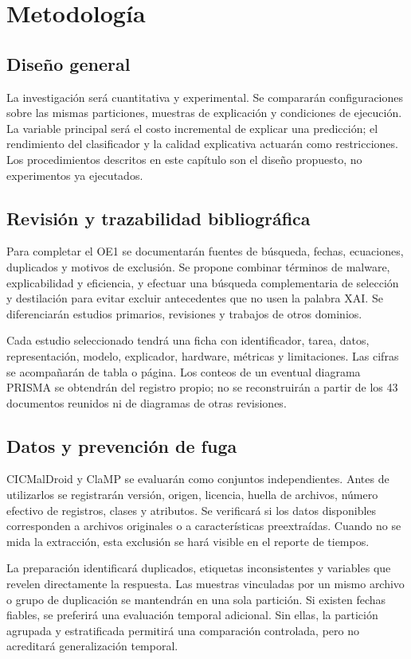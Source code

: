 \chapter{Metodología}
\section{Diseño general}
La investigación será cuantitativa y experimental. Se compararán configuraciones sobre las mismas particiones, muestras de explicación y condiciones de ejecución. La variable principal será el costo incremental de explicar una predicción; el rendimiento del clasificador y la calidad explicativa actuarán como restricciones. Los procedimientos descritos en este capítulo son el diseño propuesto, no experimentos ya ejecutados.

\section{Revisión y trazabilidad bibliográfica}
Para completar el OE1 se documentarán fuentes de búsqueda, fechas, ecuaciones, duplicados y motivos de exclusión. Se propone combinar términos de malware, explicabilidad y eficiencia, y efectuar una búsqueda complementaria de selección y destilación para evitar excluir antecedentes que no usen la palabra XAI. Se diferenciarán estudios primarios, revisiones y trabajos de otros dominios.

Cada estudio seleccionado tendrá una ficha con identificador, tarea, datos, representación, modelo, explicador, hardware, métricas y limitaciones. Las cifras se acompañarán de tabla o página. Los conteos de un eventual diagrama PRISMA se obtendrán del registro propio; no se reconstruirán a partir de los 43 documentos reunidos ni de diagramas de otras revisiones.

\section{Datos y prevención de fuga}
CICMalDroid y ClaMP se evaluarán como conjuntos independientes. Antes de utilizarlos se registrarán versión, origen, licencia, huella de archivos, número efectivo de registros, clases y atributos. Se verificará si los datos disponibles corresponden a archivos originales o a características preextraídas. Cuando no se mida la extracción, esta exclusión se hará visible en el reporte de tiempos.

La preparación identificará duplicados, etiquetas inconsistentes y variables que revelen directamente la respuesta. Las muestras vinculadas por un mismo archivo o grupo de duplicación se mantendrán en una sola partición. Si existen fechas fiables, se preferirá una evaluación temporal adicional. Sin ellas, la partición agrupada y estratificada permitirá una comparación controlada, pero no acreditará generalización temporal.

